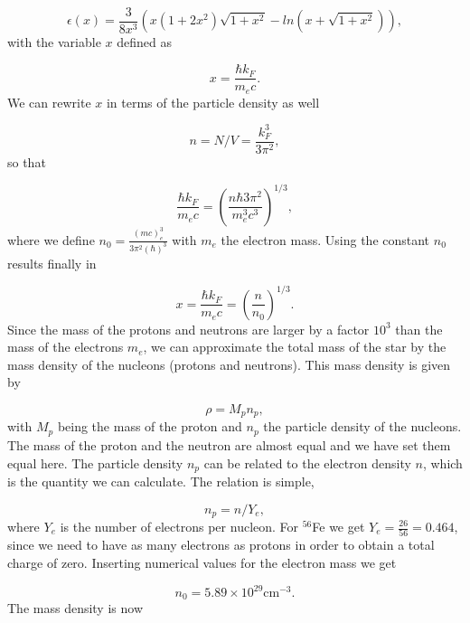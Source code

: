 \documentclass[%
oneside,                 %
final,                   %
10pt]{article}
\begin{document}
\begin{equation*}
\epsilon (x) =
\frac{3}{8x^3}\left( x(1+2x^2)\sqrt{1+x^2}-ln(x+\sqrt{1+x^2})\right),
\end{equation*}
with the variable $x$ defined as

\begin{equation*}
x=\frac{\hbar k_F}{m_ec}.
\end{equation*}
We can rewrite $x$ in terms of the particle density as well

\begin{equation*}
n=N/V=\frac{k_{F}^{3}}{3\pi^{2}},
\end{equation*}
so that

\begin{equation*}
\frac{\hbar k_F}{m_ec}=\left(\frac{n\hbar 3\pi^2}{m_e^3c^3}\right)^{1/3},
\end{equation*}
where we define
$n_{0}=\frac{(mc)^{3}_{e}}{3\pi^2(\hbar)^{3}}$ with $m_{e}$ the electron mass.
Using the constant $n_0$ results finally in

\begin{equation*}
x=\frac{\hbar k_F}{m_ec}=\left(\frac{n}{n_{0}}\right)^{1/3}.
\end{equation*}
Since the mass of the protons and neutrons are larger by a factor $10^3$ than the mass
of the electrons $m_e$, 
we can approximate the total mass of the star by the mass density of the nucleons (protons and neutrons).
This mass density is given by

\begin{equation*}
\rho = M_p n_p,
\end{equation*}
with $M_{p}$ being the  mass of the proton and $n_p$ the particle density of the nucleons.
The mass of the proton and the neutron are almost equal and we have set them equal here.
The particle density  $n_p$ can be related to the electron density $n$, which is the quantity
we can calculate. The relation is simple,

\begin{equation*}
n_p = n/Y_e ,
\end{equation*}
where $Y_{e}$ is the number of electrons per nucleon.  For $^{56}$Fe we get $Y_{e}=\frac{26}{56}=0.464$, since we 
need to have as many electrons as protons in order to obtain a total charge of zero. Inserting numerical values
for the electron mass we get

\begin{equation*}
n_{0}=5.89\times 10^{29} \mathrm{cm}^{-3}.
\end{equation*}
The mass density is now
\end{document}
